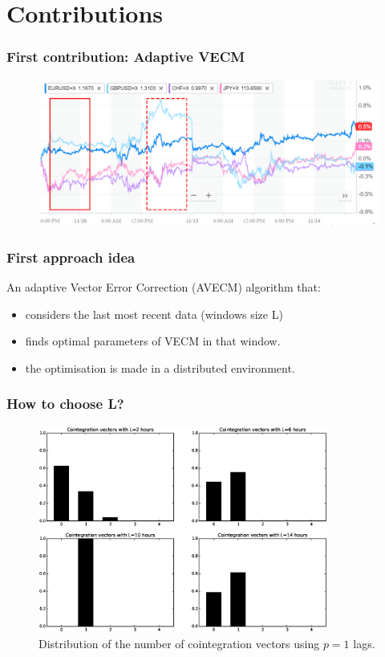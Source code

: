 \documentclass{beamer}
\begin{document}
\section{Contributions}
\begin{frame}
\frametitle{First contribution: Adaptive VECM}
\begin{figure}
\includegraphics[width=\textwidth]{img/slidingwindow}
\end{figure}
\end{frame}

\begin{frame}
\frametitle{First approach idea}
An adaptive Vector Error Correction (AVECM) algorithm that:
\begin{itemize}
\item considers the last most recent data (windows size L)
\item finds optimal parameters of VECM in that window.
\item the optimisation is made in a distributed environment.
\end{itemize}
\end{frame}

\begin{frame}
\frametitle{How to choose L?}
  \begin{figure}[!h]
  \centering
   \includegraphics[width=0.85\textwidth]{img/51_Fig1}
  \caption[Distribution of the number of cointegration vectors using $p=1$ lags]{Distribution of the number of cointegration vectors using $p=1$ lags.}
  \label{fig:hists}
\end{figure}
\end{frame}
\end{document}
